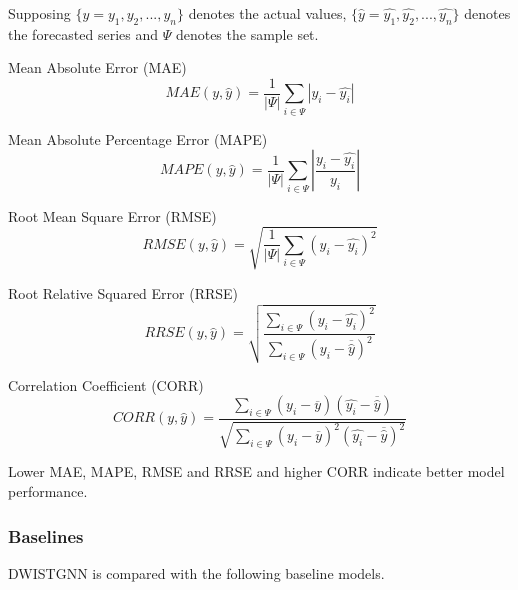 \documentclass[final,12pt]{elsarticle}
\begin{document}
Supposing $\{ y = y_1, y_2, ..., y_n \}$ denotes the actual values, 
$\{ \widehat{y} = 
\widehat{y_1}, \widehat{y_2}, ..., \widehat{y_n} \}$ 
denotes the forecasted series 
and $\Psi$ denotes the sample set.

Mean Absolute Error (MAE)
$$ MAE(y, \widehat{y}) = 
\frac{1}{|\Psi|} 
\sum_{i \in \Psi} 
|y_i - \widehat{y_i}| $$

Mean Absolute Percentage Error (MAPE)
$$ MAPE(y, \widehat{y}) = 
\frac{1}{|\Psi|} 
\sum_{i \in \Psi} 
| \frac{y_i - \widehat{y_i}}{y_i} | $$

Root Mean Square Error (RMSE)
$$ RMSE(y, \widehat{y}) = 
\sqrt{ 
\frac{1}{|\Psi|} 
\sum_{i \in \Psi} 
(y_i - \widehat{y_i})^2 } $$

Root Relative Squared Error (RRSE)
$$ RRSE(y, \widehat{y}) = 
\sqrt{ 
\frac
{ \sum_{i \in \Psi} (y_i - \widehat{y_i})^2 }
{ \sum_{i \in \Psi} (y_i - \overline{\widehat{y}})^2 } } $$

Correlation Coefficient (CORR)
$$ CORR(y, \widehat{y}) = 
\frac
{ \sum_{i \in \Psi} 
(y_{i} - \overline{y}) 
(\widehat{y_{i}} - \overline{\widehat{y}}) }
{ \sqrt{ 
\sum_{i \in \Psi} 
(y_{i} - \overline{y})^2 
(\widehat{y_{i}} - \overline{\widehat{y}})^2 } } $$

Lower MAE, MAPE, RMSE and RRSE and 
higher CORR indicate better model performance.


\subsubsection{Baselines}
\label{subsubsec-5.1.3}


DWISTGNN is compared with the following baseline models.  \\
\end{document}
